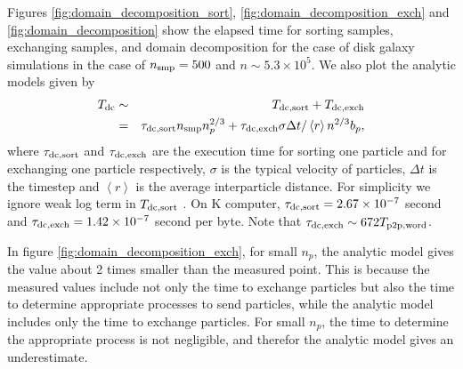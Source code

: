 Figures \ref{fig:domain_decomposition_sort}, \ref{fig:domain_decomposition_exch}
and \ref{fig:domain_decomposition} show the elapsed time for sorting
samples, exchanging samples, and domain decomposition for the case of
disk galaxy simulations in the case of $n_{\rm smp}=500$ and $n \sim
5.3 \times 10^5$. We also plot the analytic models given by
\begin{eqnarray}
\label{eq:ddfit}
  T_{\rm dc} &\sim& T_{\rm dc,sort} + T_{\rm dc,exch} \\
             &=& \tau_{\rm dc,sort} n_{\rm smp} n_p^{2/3}
                 + \tau_{\rm dc,exch} \sigma \Delta t / \left<r\right> n^{2/3} b_p,
\end{eqnarray}
where $\tau_{\rm dc,sort}$ and $\tau_{\rm dc,exch}$ are the execution
time for sorting one particle and for exchanging one particle
respectively, $\sigma$ is the typical velocity of particles, $\Delta
t$ is the timestep and $\left<r\right>$ is the average interparticle
distance. For simplicity we ignore weak log term in $T_{\rm dc,sort}$
. On K computer, $\tau_{\rm dc,sort} = 2.67\times 10^{-7}$ second and
$\tau_{\rm dc,exch} = 1.42\times 10^{-7}$ second per byte. Note that
$\tau_{\rm dc,exch} \sim 672 T_{\rm p2p,word}$.

In figure \ref{fig:domain_decomposition_exch}, for small $n_p$, the
analytic model gives the value about 2 times smaller than the measured
point. This is because the measured values include not only the time
to exchange particles but also the time to determine appropriate
processes to send particles, while the analytic model includes only
the time to exchange particles. For small $n_p$, the time to determine
the appropriate process is not negligible, and therefor the analytic
model gives an underestimate.



